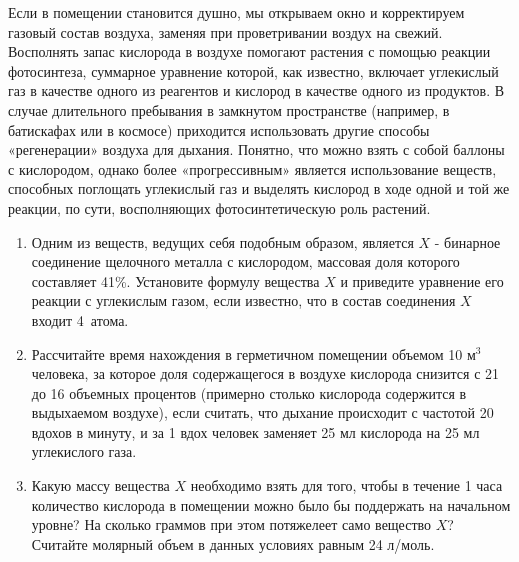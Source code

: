 
Если в помещении становится душно, мы открываем окно и корректируем газовый состав воздуха, заменяя при 
проветривании воздух на свежий. Восполнять запас кислорода в воздухе помогают растения с помощью реакции 
фотосинтеза, суммарное уравнение которой, как известно, включает углекислый газ в качестве одного из реагентов 
и кислород в качестве одного из продуктов. В случае длительного пребывания в замкнутом пространстве (например, в батискафах или в космосе) приходится использовать другие способы «регенерации» воздуха для 
дыхания. Понятно, что можно взять с собой баллоны с кислородом, однако более «прогрессивным» является 
использование веществ, способных поглощать углекислый газ и выделять кислород в ходе одной и той же реакции, 
по сути, восполняющих фотосинтетическую роль растений.

\begin{enumerate}
    \item Одним из веществ, ведущих себя подобным образом, является $X$ - бинарное соединение щелочного металла с кислородом, 
    массовая доля которого составляет 41\%. Установите формулу вещества $X$ и приведите уравнение его реакции с углекислым 
    газом, если известно, что в состав соединения $X$ входит 4~атома.
    \item Рассчитайте время нахождения в герметичном помещении объемом 10 м$^3$ человека, за которое доля 
    содержащегося в воздухе кислорода снизится с 21 до 16 объемных процентов (примерно столько кислорода 
    содержится в выдыхаемом воздухе), если считать, что дыхание происходит с частотой 20 вдохов в минуту, 
    и за 1 вдох человек заменяет 25 мл кислорода на 25 мл углекислого газа.
    \item Какую массу вещества $X$ необходимо взять для того, чтобы в течение 1 часа 
    количество кислорода в помещении можно было бы поддержать на начальном уровне? На 
    сколько граммов при этом потяжелеет само вещество $X$? Считайте молярный объем в данных условиях равным 24 л/моль.    
\end{enumerate}

